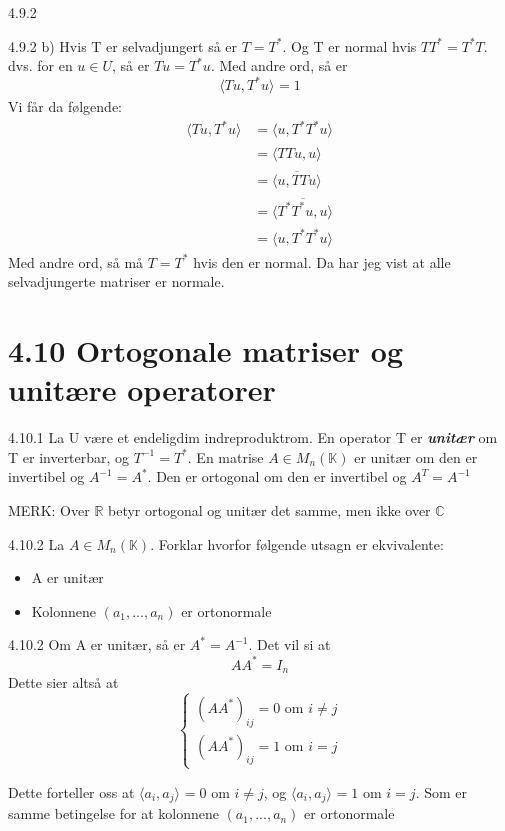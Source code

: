\documentclass[a4paper,norsk]{article}
\begin{document}
\begin{oppgavebox}{4.9.2}{}
\begin{proofbox}{4.9.2 b)}{}
    Hvis T er selvadjungert så er $ T = T^* $. Og T er normal hvis $ TT^* = T^*T $. dvs. for en $ u \in U $, så er $ Tu = T^*u $. Med andre ord, så er 
    \[
        \langle Tu, T^*u \rangle_{  } =1
    \]
    Vi får da følgende:
    \begin{align*}
        \langle Tu, T^*u \rangle_{  } &= \langle u, T^*T^* u \rangle_{  } \\
        &= \langle TTu, u \rangle_{  } \\
        &= \overline{ \langle u, TTu \rangle_{  } }\\
        &= \overline{ \langle T^*T^*u, u \rangle_{  } } \\
        &= \langle u, T^*T^*u \rangle_{  } 
    \end{align*}
    Med andre ord, så må $ T=T^* $ hvis den er normal. Da har jeg vist at alle selvadjungerte matriser er normale. 
\end{proofbox}
\end{oppgavebox}

\section*{4.10 Ortogonale matriser og unitære operatorer} 


\begin{definitionbox}{4.10.1}{}
    La U være et endeligdim indreproduktrom. En operator T er \textbf{\textit{unitær}} om T er inverterbar, og $ T^{-1}=T^* $. En matrise $ A \in M_n(\mathbb{K}) $ er unitær om den er invertibel og $ A^{-1} = A^* $. Den er ortogonal om den er invertibel og $ A^T = A^{-1} $ 
\end{definitionbox}
MERK: Over $ \mathbb{R} $ betyr ortogonal og unitær det samme, men ikke over $ \mathbb{C} $ 


\begin{oppgavebox}{4.10.2}{}
La $ A \in M_n (\mathbb{K}) $. Forklar hvorfor følgende utsagn er ekvivalente:
\begin{itemize}
    \item A er unitær
    \item Kolonnene $ \left( a_1, ..., a_n \right)  $ er ortonormale
\end{itemize}
\begin{proofbox}{4.10.2}{}
    Om A er unitær, så er $ A^* = A^{-1} $. Det vil si at 
\[
    AA^* = I_n
\]
Dette sier altså at 
\[
\begin{cases}
\left( AA^* \right) _{ij} = 0 \text{ om } i \neq j \\
\left( AA^* \right) _{ij} = 1 \text{ om } i = j
\end{cases}
\] 

Dette forteller oss at $ \langle a_i, a_j \rangle_{  } =0 $ om $ i \neq j $, og $ \langle a_i, a_j \rangle_{  } = 1 $ om $ i=j $. Som er samme betingelse for at kolonnene $ \left( a_1, ..., a_n \right)  $ er ortonormale
\end{proofbox}
\end{oppgavebox}
\end{document}
